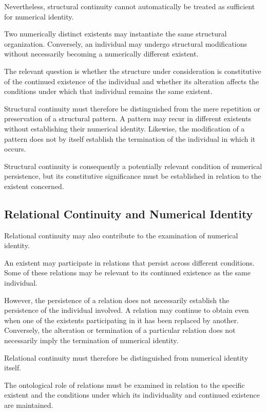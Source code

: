 Nevertheless, structural continuity
cannot automatically be treated as
sufficient for numerical identity.

Two numerically distinct existents may
instantiate the same structural organization.
Conversely, an individual may undergo
structural modifications without necessarily
becoming a numerically different existent.

The relevant question is whether the
structure under consideration is
constitutive of the continued existence
of the individual and whether its alteration
affects the conditions under which that
individual remains the same existent.

Structural continuity must therefore
be distinguished from the mere repetition
or preservation of a structural pattern.
A pattern may recur in different existents
without establishing their numerical
identity. Likewise, the modification
of a pattern does not by itself establish
the termination of the individual in
which it occurs.

Structural continuity is consequently
a potentially relevant condition of
numerical persistence, but its constitutive
significance must be established in
relation to the existent concerned.

\subsection{Relational Continuity and Numerical Identity}

Relational continuity may also contribute
to the examination of numerical identity.

An existent may participate in relations
that persist across different conditions.
Some of these relations may be relevant
to its continued existence as the same
individual.

However, the persistence of a relation
does not necessarily establish the
persistence of the individual involved.
A relation may continue to obtain even
when one of the existents participating
in it has been replaced by another.
Conversely, the alteration or termination
of a particular relation does not
necessarily imply the termination of
numerical identity.

Relational continuity must therefore
be distinguished from numerical identity
itself.

The ontological role of relations must
be examined in relation to the specific
existent and the conditions under which
its individuality and continued existence
are maintained.

